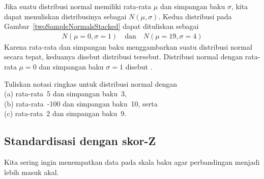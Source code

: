 Jika suatu distribusi normal memiliki rata-rata $\mu$ dan simpangan baku
$\sigma$, kita dapat menuliskan distribusinya sebagai $N(\mu, \sigma)$.
Kedua distribusi pada Gambar~\ref{twoSampleNormalsStacked}
dapat dituliskan sebagai
\begin{align*}
N(\mu=0,\sigma=1)
  \quad \text{dan} \quad
  N(\mu=19,\sigma=4)
\end{align*}
Karena rata-rata dan simpangan baku menggambarkan suatu distribusi normal
secara tepat, keduanya disebut
 distribusi tersebut.
Distribusi normal dengan rata-rata $\mu = 0$ dan
simpangan baku $\sigma = 1$ disebut
%
.

\begin{exercisewrap}
\begin{nexercise}
Tuliskan notasi ringkas untuk distribusi normal
dengan\footnotemark{} \\
(a)
    rata-rata~5 dan simpangan baku~3, \\
(b)
    rata-rata~-100 dan simpangan baku~10, serta \\
(c)
    rata-rata~2 dan simpangan baku~9.
\end{nexercise}
\end{exercisewrap}


\subsection{Standardisasi dengan skor-Z}

\noindent%
Kita sering ingin menempatkan data pada skala baku agar
perbandingan menjadi lebih masuk akal.

\newcommand{\satmean}{1100}
\newcommand{\satsd}{200}
\newcommand{\actmean}{21}
\newcommand{\actsd}{6}
\newcommand{\annsatscore}{1300}
\newcommand{\annsatzscore}{1}
\newcommand{\tomsatscore}{24}
\newcommand{\tomsatzscore}{0.5}

